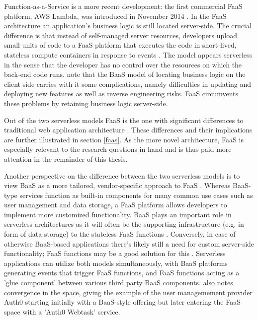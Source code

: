 \documentclass[utf8,english]{gradu3}
\begin{document}
Function-as-a-Service is a more recent development: the first commercial FaaS platform, AWS Lambda, was introduced in November 2014 \parencite{awslambda0218}. In the FaaS architecture an application's business logic is still located server-side. The crucial difference is that instead of self-managed server resources, developers upload small units of code to a FaaS platform that executes the code in short-lived, stateless compute containers in response to events \parencite{robert2016serverlessarchitectures}. The model appears serverless in the sense that the developer has no control over the resources on which the back-end code runs. \textcite{albuquerque17faaspaas} note that the BaaS model of locating business logic on the client side carries with it some complications, namely difficulties in updating and deploying new features as well as reverse engineering risks. FaaS circumvents these problems by retaining business logic server-side.

Out of the two serverless models FaaS is the one with significant differences to traditional web application architecture \parencite{robert2016serverlessarchitectures}. These differences and their implications are further illustrated in section \ref{faas}. As the more novel architecture, FaaS is especially relevant to the research questions in hand and is thus paid more attention in the remainder of this thesis.

Another perspective on the difference between the two serverless models is to view BaaS as a more tailored, vendor-specific approach to FaaS \parencite{van2017spec}. Whereas BaaS-type services function as built-in components for many common use cases such as user management and data storage, a FaaS platform allows developers to implement more customized functionality. BaaS plays an important role in serverless architectures as it will often be the supporting infrastructure (e.g. in form of data storage) to the stateless FaaS functions \parencite{cncf18serverlessWG}. Conversely, in case of otherwise BaaS-based applications there's likely still a need for custom server-side functionality; FaaS functions may be a good solution for this \parencite{robert2016serverlessarchitectures}. Serverless applications can utilize both models simultaneously, with BaaS platforms generating events that trigger FaaS functions, and FaaS functions acting as a 'glue component' between various third party BaaS components. \textcite{robert2016serverlessarchitectures} also notes convergence in the space, giving the example of the user managemement provider Auth0 starting initially with a BaaS-style offering but later entering the FaaS space with a 'Auth0 Webtask' service.
\end{document}
